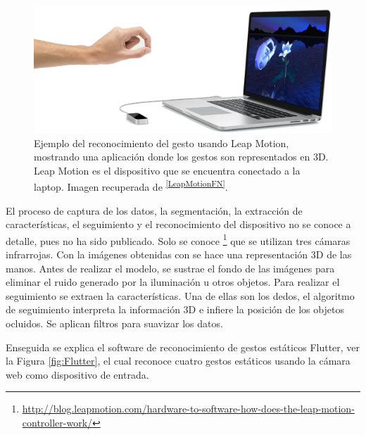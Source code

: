 \begin{figure}[h!]
\begin{center}
\includegraphics[scale=.3]{./Figures/LeapMotion.png}
\end{center}
\caption{Ejemplo del reconocimiento del gesto usando Leap Motion, mostrando una aplicación donde los gestos son representados en 3D. Leap Motion es el dispositivo que se encuentra conectado a la laptop. Imagen recuperada de \textsuperscript{\ref{LeapMotionFN}}.}
\label{fig:LeapMotion}
\end{figure}

El proceso de captura de los datos, la segmentación, la extracción de características, el seguimiento y el reconocimiento del dispositivo no se conoce a detalle, pues no ha sido publicado.
Solo se conoce \footnote{ \url{http://blog.leapmotion.com/hardware-to-software-how-does-the-leap-motion-controller-work/}} que se utilizan tres cámaras infrarrojas. Con la imágenes obtenidas con se hace una representación 3D de las manos. Antes de realizar el modelo,  se sustrae el fondo de las imágenes para eliminar el ruido generado por la iluminación u otros objetos. 
Para realizar el seguimiento se extraen la características. Una de ellas son los dedos, el algoritmo de seguimiento interpreta la información 3D e infiere la posición de los objetos ocluidos. Se aplican filtros para suavizar los datos. 

Enseguida se explica el software de reconocimiento de gestos estáticos Flutter, ver la Figura \ref{fig:Flutter}, el cual reconoce cuatro gestos estáticos usando la cámara web como dispositivo de entrada. 


